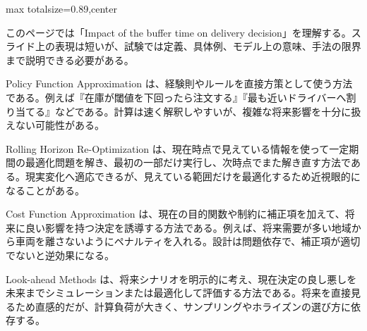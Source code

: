 \begin{minipage}[t]{0.58\textwidth}
\begin{adjustbox}{max totalsize={\textwidth}{0.89\textheight},center}
\begin{minipage}{\textwidth}\scriptsize
{}このページでは「Impact of the buffer time on delivery decision」を理解する。スライド上の表現は短いが、試験では定義、具体例、モデル上の意味、手法の限界まで説明できる必要がある。\par
Policy Function Approximation は、経験則やルールを直接方策として使う方法である。例えば『在庫が閾値を下回ったら注文する』『最も近いドライバーへ割り当てる』などである。計算は速く解釈しやすいが、複雑な将来影響を十分に扱えない可能性がある。\par
Rolling Horizon Re-Optimization は、現在時点で見えている情報を使って一定期間の最適化問題を解き、最初の一部だけ実行し、次時点でまた解き直す方法である。現実変化へ適応できるが、見えている範囲だけを最適化するため近視眼的になることがある。\par
Cost Function Approximation は、現在の目的関数や制約に補正項を加えて、将来に良い影響を持つ決定を誘導する方法である。例えば、将来需要が多い地域から車両を離さないようにペナルティを入れる。設計は問題依存で、補正項が適切でないと逆効果になる。\par
Look-ahead Methods は、将来シナリオを明示的に考え、現在決定の良し悪しを未来までシミュレーションまたは最適化して評価する方法である。将来を直接見るため直感的だが、計算負荷が大きく、サンプリングやホライズンの選び方に依存する。\par

\end{minipage}
\end{adjustbox}
\end{minipage}
